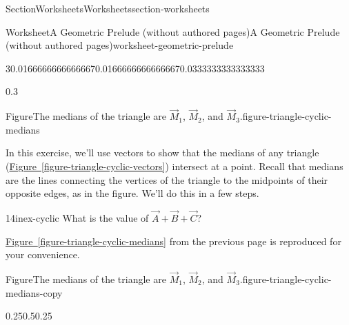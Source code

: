 \documentclass[oneside,10pt,]{article}
\newcommand{\xreffont}{\relax}
\numberwithin{equation}{section}
\begin{document}
\begin{sectionptx}{Section}{Worksheets}{}{Worksheets}{}{}{section-worksheets}
\begin{worksheet-subsection}{Worksheet}{A Geometric Prelude (without authored pages)}{}{A Geometric Prelude (without authored pages)}{}{}{worksheet-geometric-prelude}
\begin{introduction}{}
\begin{sidebyside}{3}{0.0166666666666667}{0.0166666666666667}{0.0333333333333333}
\begin{sbspanel}{0.3}
\begin{panelfigureptx}{Figure}{The medians of the triangle are \(\vec{M}_1\), \(\vec{M}_2\), and \(\vec{M}_3\).}{figure-triangle-cyclic-medians}{}
{%
}%
\tcblower
\end{panelfigureptx}%
\end{sbspanel}%
\end{sidebyside}%
\par
In this exercise, we'll use vectors to show that the medians of any triangle (\hyperref[figure-triangle-cyclic-vectors]{Figure~{\xreffont\ref{figure-triangle-cyclic-vectors}}}) intersect at a point. Recall that medians are the lines connecting the vertices of the triangle to the midpoints of their opposite edges, as in the figure. We'll do this in a few steps.%
\end{introduction}%
\begin{divisionexercise}{1}{}{4in}{ex-cyclic}%
What is the value of \(\vec{A} + \vec{B} + \vec{C}\)?%
\end{divisionexercise}%
\hyperref[figure-triangle-cyclic-medians]{Figure~{\xreffont\ref{figure-triangle-cyclic-medians}}} from the previous page is reproduced for your convenience.%
\begin{figureptx}{Figure}{The medians of the triangle are \(\vec{M}_1\), \(\vec{M}_2\), and \(\vec{M}_3\).}{figure-triangle-cyclic-medians-copy}{}%
\begin{image}{0.25}{0.5}{0.25}{}%
\end{image}
\end{figureptx}
\end{worksheet-subsection}
\end{sectionptx}
\end{document}
